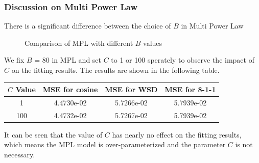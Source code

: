 \documentclass[aspectratio=169]{beamer}
\begin{document}
    \begin{frame}
        \frametitle{Discussion on Multi Power Law}
        There is a significant difference between the choice of $B$ in
        Multi Power Law
        \begin{figure}
            \centering
            \caption{Comparison of MPL with different $B$ values}
        \end{figure}
    \end{frame}

    \begin{frame}
        We fix $B$ = 80 in MPL and set $C$ to 1 or 100 sperately to observe the
        impact of $C$ on the fitting results. The results are shown in
        the following table.
        \begin{table}
            \centering
            \begin{tabular}{cccc}
                \toprule
                $C$ Value & MSE for cosine & MSE for WSD & MSE for 8-1-1 \\
                \midrule
                1         & 4.4730e-02     & 5.7266e-02  & 5.7939e-02    \\
                100       & 4.4732e-02     & 5.7267e-02  & 5.7939e-02    \\
                \bottomrule
            \end{tabular}\label{tab:table}
        \end{table}

        It can be seen that the value of $C$ has nearly no effect on the
        fitting results, which means the MPL model is over-parameterized
        and the parameter $C$ is not necessary.
    \end{frame}
\end{document}
